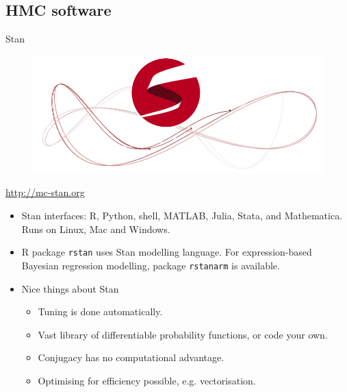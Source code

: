 \documentclass[]{beamer}\usepackage[]{graphicx}\usepackage[]{color}
\begin{document}
\subsection{HMC software}

\begin{frame}{Stan}
	\vspace{-5mm}
	\begin{figure}[hbt]
		\includegraphics[scale=0.25]{figure/mc-stan}
	\end{figure}
	\vspace{-5mm}

	\centering \url{http://mc-stan.org}
	\vspace{3mm}

	\begin{itemize}
		\item Stan interfaces: R, Python, shell, MATLAB, Julia, Stata, and Mathematica. Runs on Linux, Mac and Windows.
		\item R package \texttt{rstan} uses Stan modelling language. For expression-based Bayesian regression modelling, package \texttt{rstanarm} is available.
		\item Nice things about Stan
		\begin{itemize}
			\item Tuning is done automatically.
			\item Vast library of differentiable probability functions, or code your own.
			\item Conjugacy has no computational advantage.
			\item Optimising for efficiency possible, e.g. vectorisation.
		\end{itemize}
	\end{itemize}
\end{frame}
\end{document}
